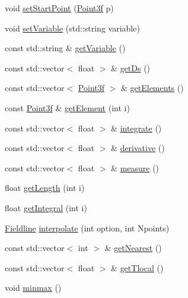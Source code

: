 \begin{DoxyCompactItemize}
\item 
void \hyperlink{classccmc_1_1_fieldline_a1bbfa14097ea4e6cb854b68a603eb891}{set\-Start\-Point} (\hyperlink{classccmc_1_1_point3f}{Point3f} p)
\item 
void \hyperlink{classccmc_1_1_fieldline_a9fa22375c1276932380a259952f966ca}{set\-Variable} (std\-::string variable)
\item 
const std\-::string \& \hyperlink{classccmc_1_1_fieldline_a9403dca3b1c98f35f9e9bb5cc340bd3a}{get\-Variable} ()
\item 
const std\-::vector$<$ float $>$ \& \hyperlink{classccmc_1_1_fieldline_af89e2d72b06b4e7157d3f7e5ac1b4928}{get\-Ds} ()
\item 
const std\-::vector$<$ \hyperlink{classccmc_1_1_point3f}{Point3f} $>$ \& \hyperlink{classccmc_1_1_fieldline_ad238f0bd5cda88ec64bbd7fa951cee87}{get\-Elements} ()
\item 
const \hyperlink{classccmc_1_1_point3f}{Point3f} \& \hyperlink{classccmc_1_1_fieldline_a0ef624f19c2f6268c1539fe8a5246ffb}{get\-Element} (int i)
\item 
const std\-::vector$<$ float $>$ \& \hyperlink{classccmc_1_1_fieldline_ae0923bc16ca3181c3d3a7c46c5cad55a}{integrate} ()
\item 
const std\-::vector$<$ float $>$ \& \hyperlink{classccmc_1_1_fieldline_a360a20c0b4e4f39d11545ca22a06199a}{derivative} ()
\item 
const std\-::vector$<$ float $>$ \& \hyperlink{classccmc_1_1_fieldline_a39cd6708e840c29c4e85b445fb14e017}{measure} ()
\item 
float \hyperlink{classccmc_1_1_fieldline_a15e1c45287ad52604fc681c40b02c3c2}{get\-Length} (int i)
\item 
float \hyperlink{classccmc_1_1_fieldline_afd11cbe0d7332baaa2f659e909e9206b}{get\-Integral} (int i)
\item 
\hyperlink{classccmc_1_1_fieldline}{Fieldline} \hyperlink{classccmc_1_1_fieldline_a3c641db4971a6cbcce5ef3fb0bc3e01d}{interpolate} (int option, int Npoints)
\item 
const std\-::vector$<$ int $>$ \& \hyperlink{classccmc_1_1_fieldline_a69dbf2cdbb0bd332e07d605545094441}{get\-Nearest} ()
\item 
const std\-::vector$<$ float $>$ \& \hyperlink{classccmc_1_1_fieldline_aab3aa25ca4f65e88eeecfb4b1376e3b5}{get\-Tlocal} ()
\item 
void \hyperlink{classccmc_1_1_fieldline_a53d2fbcbc58652b7573315ed4f3f6850}{minmax} ()
\end{DoxyCompactItemize}
